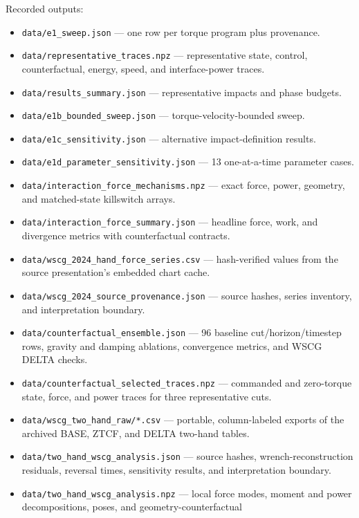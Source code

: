 \documentclass[
  letterpaper,
]{report}
\providecommand{\tightlist}{%
  \setlength{\itemsep}{0pt}\setlength{\parskip}{0pt}}
\begin{document}
Recorded outputs:

\begin{itemize}
\tightlist
\item
  \texttt{data/e1\_sweep.json} --- one row per torque program plus
  provenance.
\item
  \texttt{data/representative\_traces.npz} --- representative state,
  control, counterfactual, energy, speed, and interface-power traces.
\item
  \texttt{data/results\_summary.json} --- representative impacts and
  phase budgets.
\item
  \texttt{data/e1b\_bounded\_sweep.json} --- torque-velocity-bounded
  sweep.
\item
  \texttt{data/e1c\_sensitivity.json} --- alternative impact-definition
  results.
\item
  \texttt{data/e1d\_parameter\_sensitivity.json} --- 13 one-at-a-time
  parameter cases.
\item
  \texttt{data/interaction\_force\_mechanisms.npz} --- exact force,
  power, geometry, and matched-state killswitch arrays.
\item
  \texttt{data/interaction\_force\_summary.json} --- headline force,
  work, and divergence metrics with counterfactual contracts.
\item
  \texttt{data/wscg\_2024\_hand\_force\_series.csv} --- hash-verified
  values from the source presentation's embedded chart cache.
\item
  \texttt{data/wscg\_2024\_source\_provenance.json} --- source hashes,
  series inventory, and interpretation boundary.
\item
  \texttt{data/counterfactual\_ensemble.json} --- 96 baseline
  cut/horizon/timestep rows, gravity and damping ablations, convergence
  metrics, and WSCG DELTA checks.
\item
  \texttt{data/counterfactual\_selected\_traces.npz} --- commanded and
  zero-torque state, force, and power traces for three representative
  cuts.
\item
  \texttt{data/wscg\_two\_hand\_raw/*.csv} --- portable, column-labeled
  exports of the archived BASE, ZTCF, and DELTA two-hand tables.
\item
  \texttt{data/two\_hand\_wscg\_analysis.json} --- source hashes,
  wrench-reconstruction residuals, reversal times, sensitivity results,
  and interpretation boundary.
\item
  \texttt{data/two\_hand\_wscg\_analysis.npz} --- local force modes,
  moment and power decompositions, poses, and geometry-counterfactual

\end{itemize}
\end{document}
